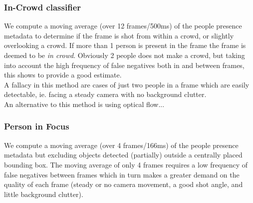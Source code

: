\subsubsection{In-Crowd classifier}
%
We compute a moving average (over 12 frames/500ms) of the people presence metadata to determine if the frame is shot from within a crowd, or slightly overlooking a crowd. If more than 1 person is present in the frame the frame is deemed to be \textit{in crowd}. Obviously 2 people does not make a crowd, but taking into account the high frequency of false negatives both in and between frames, this shows to provide a good estimate.\\
A fallacy in this method are cases of just two people in a frame which are easily detectable, ie. facing a steady camera with no background clutter.\\
An alternative to this method is using optical flow... %
%
\subsubsection{Person in Focus}
%
We compute a moving average (over 4 frames/166ms) of the people presence metadata but excluding objects detected (partially) outside a centrally placed bounding box. The moving average of only 4 frames requires a low frequency of false negatives between frames which in turn makes a greater demand on the quality of each frame (steady or no camera movement, a good shot angle, and little background clutter).
%
